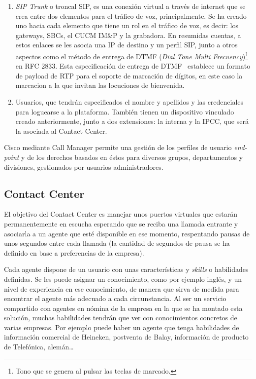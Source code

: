 \documentclass[a4paper, 12pt]{book}
\begin{document}
\begin{enumerate}
  \item \emph{SIP Trunk} o troncal SIP, es una conexión virtual a través de internet que se crea entre dos elementos para el tráfico de voz, principalmente. Se ha creado uno hacia cada elemento que tiene un rol en el tráfico de voz, es decir: los gateways, SBCs, el CUCM IM\&P y la grabadora. En resumidas cuentas, a estos enlaces se les asocia una IP de destino y un perfil SIP, junto a otros aspectos como el método de entrega de DTMF (\emph{Dial Tone Multi Frecuency})\footnote{Tono que se genera al pulsar las teclas de marcado.} en RFC 2833. Esta especificación de entrega de DTMF~\cite{rfc2833} establece un formato de payload de RTP para el soporte de marcación de dígitos, en este caso la marcacion a la que invitan las locuciones de bienvenida.
  \item Usuarios, que tendrán especificados el nombre y apellidos y las credenciales para loguearse a la plataforma. También tienen un dispositivo vinculado creado anteriormente, junto a dos extensiones: la interna y la IPCC, que será la asociada al Contact Center.
\end{enumerate}

Cisco mediante Call Manager permite una gestión de los perfiles de usuario \emph{end-point} y de los derechos basados en éstos para diversos grupos, departamentos y divisiones, gestionados por usuarios administradores.

\subsection{Contact Center}
\label{sec:contact_center}

El objetivo del Contact Center es manejar unos puertos virtuales que estarán permanentemente en escucha esperando que se reciba una llamada entrante y asociarla a un agente que esté disponible en ese momento, respentando pausas de unos segundos entre cada llamada (la cantidad de segundos de pausa se ha definido en base a preferencias de la empresa).

Cada agente dispone de un usuario con unas características y \emph{skills} o habilidades definidas. Se les puede asignar un conocimiento, como por ejemplo inglés, y un nivel de experiencia en ese conocimiento, de manera que sirva de medida para encontrar el agente más adecuado a cada circunstancia.
Al ser un servicio compartido con agentes en nómina de la empresa en la que se ha montado esta solución, muchas habilidades tendrán que ver con conocimientos concretos de varias empresas. Por ejemplo puede haber un agente que tenga habilidades de  información comercial de Heineken, postventa de Balay, información de producto de Telefónica, alemán\ldots
\end{document}
